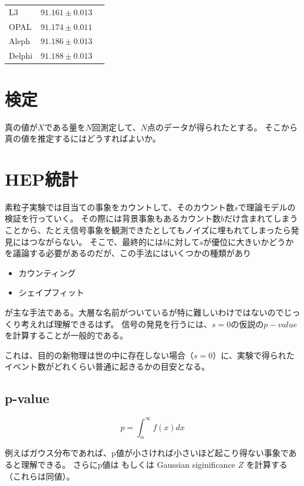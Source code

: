 \documentclass[uplatex]{jreport}
\begin{document}
\begin{table}
  \centering
  \begin{tabular}{lll}
    L3        & $91.161 \pm 0.013$   \\
    OPAL      & $91.174 \pm 0.011$    \\
    Aleph       & $91.186 \pm 0.013$ \\
    Delphi      & $91.188 \pm 0.013$
  \end{tabular}
\end{table}

\chapter{検定}
真の値が$X$である量を$N$回測定して、$N$点のデータが得られたとする。
そこから真の値を推定するにはどうすればよいか。

\chapter{HEP統計}
素粒子実験では目当ての事象をカウントして、そのカウント数$s$で理論モデルの検証を行っていく。
その際には背景事象もあるカウント数$b$だけ含まれてしまうことから、たとえ信号事象を観測できたとしてもノイズに埋もれてしまったら発見にはつながらない。
そこで、最終的には$b$に対して$s$が優位に大きいかどうかを議論する必要があるのだが、この手法にはいくつかの種類があり

\begin{itemize}
  \item カウンティング
  \item シェイプフィット
\end{itemize}

が主な手法である。大層な名前がついているが特に難しいわけではないのでじっくり考えれば理解できるはず。
信号の発見を行うには、$s=0$の仮説の$p-value$を計算することが一般的である。

これは、目的の新物理は世の中に存在しない場合（$s=0$）に、実験で得られたイベント数がどれくらい普通に起きるかの目安となる。

\section{p-value}

\begin{equation}
  p = \int_{\alpha}^{\infty} f(x)dx
\end{equation}

例えばガウス分布であれば、p値が小さければ小さいほど起こり得ない事象であると理解できる。
さらにp値は もしくは Gaussian siginificance $Z$ を計算する（これらは同値）。
\end{document}
